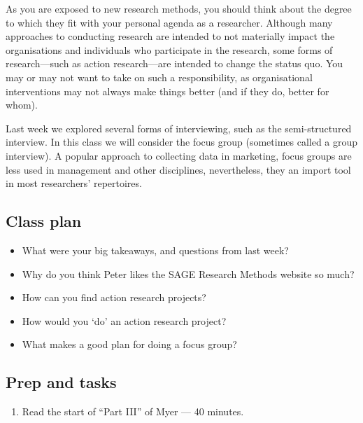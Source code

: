 \documentclass[]{book}
\providecommand{\tightlist}{%
  \setlength{\itemsep}{0pt}\setlength{\parskip}{0pt}}
\theoremstyle{definition}
\theoremstyle{definition}
\theoremstyle{definition}
\theoremstyle{remark}
\begin{document}
As you are exposed to new research methods, you should think about the
degree to which they fit with your personal agenda as a researcher.
Although many approaches to conducting research are intended to not
materially impact the organisations and individuals who participate in
the research, some forms of research---such as action research---are
intended to change the status quo. You may or may not want to take on
such a responsibility, as organisational interventions may not always
make things better (and if they do, better for whom).

Last week we explored several forms of interviewing, such as the
semi-structured interview. In this class we will consider the focus
group (sometimes called a group interview). A popular approach to
collecting data in marketing, focus groups are less used in management
and other disciplines, nevertheless, they an import tool in most
researchers' repertoires.

\hypertarget{class-plan-2}{%
\subsection*{Class plan}\label{class-plan-2}}

\begin{itemize}
\item
  What were your big takeaways, and questions from last week?
\item
  Why do you think Peter likes the SAGE Research Methods website so
  much?
\item
  How can you find action research projects?
\item
  How would you `do' an action research project?
\item
  What makes a good plan for doing a focus group?
\end{itemize}

\hypertarget{prep-and-tasks-2}{%
\subsection*{Prep and tasks}\label{prep-and-tasks-2}}

\begin{enumerate}
\def\labelenumi{\arabic{enumi}.}
\tightlist
\item
  Read the start of ``Part III'' of Myer \autocite*[
  p.~57--72]{myers_2013_qualitativeresearchbusiness} --- 40 minutes.
\end{enumerate}
\end{document}
